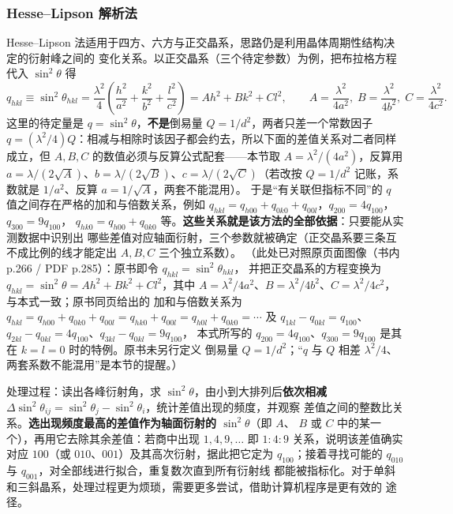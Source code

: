 \subsubsection{Hesse--Lipson 解析法}

\begin{principle}
Hesse--Lipson 法适用于四方、六方与正交晶系，思路仍是利用晶体周期性结构决定的衍射峰之间的
变化关系。以正交晶系（三个待定参数）为例，把布拉格方程代入 $\sin^{2}\theta$ 得
\begin{equation}
q_{hkl}\equiv\sin^{2}\theta_{hkl}
=\frac{\lambda^{2}}{4}\left(\frac{h^{2}}{a^{2}}+\frac{k^{2}}{b^{2}}+\frac{l^{2}}{c^{2}}\right)
=A h^{2}+B k^{2}+C l^{2},\qquad
A=\frac{\lambda^{2}}{4a^{2}},\;B=\frac{\lambda^{2}}{4b^{2}},\;C=\frac{\lambda^{2}}{4c^{2}} .
\label{eq:ch04b-HL}
\end{equation}
这里的待定量是 $q=\sin^{2}\theta$，\textbf{不是}倒易量 $Q=1/d^{2}$，两者只差一个常数因子
$q=(\lambda^{2}/4)Q$：相减与相除时该因子都会约去，所以下面的差值关系对二者同样成立，但
$A,B,C$ 的数值必须与反算公式配套——本节取 $A=\lambda^{2}/(4a^{2})$，反算用
$a=\lambda/(2\sqrt{A})$、$b=\lambda/(2\sqrt{B})$、$c=\lambda/(2\sqrt{C})$（若改按
$Q=1/d^{2}$ 记账，系数就是 $1/a^{2}$、反算 $a=1/\sqrt{A}$，两套不能混用）。
于是“有关联但指标不同”的 $q$ 值之间存在严格的加和与倍数关系，例如
$q_{hkl}=q_{h00}+q_{0k0}+q_{00l}$，$q_{200}=4q_{100}$，$q_{300}=9q_{100}$，
$q_{hk0}=q_{h00}+q_{0k0}$ 等。\textbf{这些关系就是该方法的全部依据}：只要能从实测数据中识别出
哪些差值对应轴面衍射，三个参数就被确定（正交晶系要三条互不成比例的线才能定出 $A,B,C$
三个独立系数）。
（此处已对照原页面图像（书内 p.266 / PDF p.285）：原书即令 $q_{hkl}=\sin^{2}\theta_{hkl}$，
并把正交晶系的方程变换为 $q_{hkl}=\sin^{2}\theta=Ah^{2}+Bk^{2}+Cl^{2}$，其中
$A=\lambda^{2}/4a^{2}$、$B=\lambda^{2}/4b^{2}$、$C=\lambda^{2}/4c^{2}$，与本式一致；原书同页给出的
加和与倍数关系为 $q_{hkl}=q_{h00}+q_{0k0}+q_{00l}=q_{hk0}+q_{00l}=q_{h0l}+q_{0k0}=\cdots$ 及
$q_{1kl}-q_{0kl}=q_{100}$、$q_{2kl}-q_{0kl}=4q_{100}$、$q_{3kl}-q_{0kl}=9q_{100}$，
本式所写的 $q_{200}=4q_{100}$、$q_{300}=9q_{100}$ 是其在 $k=l=0$ 时的特例。原书未另行定义
倒易量 $Q=1/d^{2}$；“$q$ 与 $Q$ 相差 $\lambda^{2}/4$、两套系数不能混用”是本节的提醒。）
\end{principle}

\begin{measure}
处理过程：读出各峰衍射角，求 $\sin^{2}\theta$，由小到大排列后\textbf{依次相减}
$\Delta\sin^{2}\theta_{ij}=\sin^{2}\theta_{j}-\sin^{2}\theta_{i}$，统计差值出现的频度，并观察
差值之间的整数比关系。\textbf{选出现频度最高的差值作为轴面衍射的 $\sin^{2}\theta$}（即 $A$、
$B$ 或 $C$ 中的某一个），再用它去除其余差值：若商中出现 $1,4,9,\dots$ 即
$1:4:9$ 关系，说明该差值确实对应 $100$（或 $010$、$001$）及其高次衍射，据此把它定为
$q_{100}$；接着寻找可能的 $q_{010}$ 与 $q_{001}$，对全部线进行拟合，重复数次直到所有衍射线
都能被指标化。对于单斜和三斜晶系，处理过程更为烦琐，需要更多尝试，借助计算机程序是更有效的
途径。
\end{measure}

